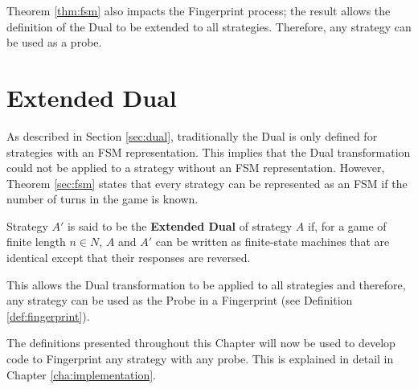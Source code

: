 Theorem \ref{thm:fsm} also impacts the Fingerprint process; the result allows the definition of the Dual to be extended to all strategies.
Therefore, any strategy can be used as a probe.


\section{Extended Dual}\label{sec:extend-dual}

As described in Section \ref{sec:dual}, traditionally the Dual is only defined for strategies with an FSM representation.
This implies that the Dual transformation could not be applied to a strategy without an FSM representation.
However, Theorem \ref{sec:fsm} states that every strategy can be represented as an FSM if the number of turns in the game is known.

\begin{definition}\label{def:extend-dual}
Strategy $A'$ is said to be the \textbf{Extended Dual} of strategy $A$ if, for a game of finite length $n \in N$, $A$ and $A'$ can be written as finite-state machines that are identical except that their responses are reversed.
\end{definition}

This allows the Dual transformation to be applied to all strategies and therefore, any strategy can be used as the Probe in a Fingerprint (see Definition \ref{def:fingerprint}).

The definitions presented throughout this Chapter will now be used to develop code to Fingerprint any strategy with any probe.
This is explained in detail in Chapter \ref{cha:implementation}.

